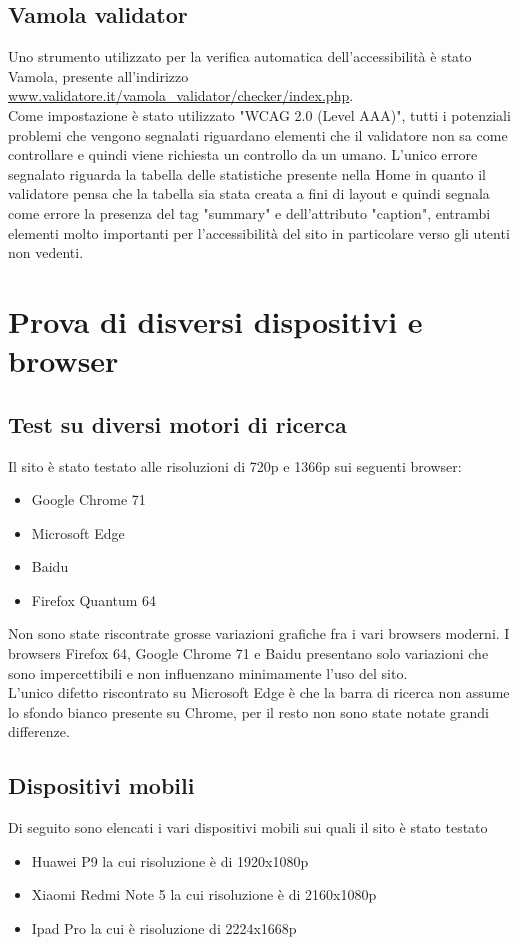 \documentclass[openany, a4paper, 12pt]{report}
\begin{document}
			\subsection{Vamola validator}
				Uno strumento utilizzato per la verifica automatica dell'accessibilità è stato Vamola, presente all'indirizzo \url{www.validatore.it/vamola_validator/checker/index.php}.\\
				Come impostazione è stato utilizzato "WCAG 2.0 (Level AAA)", tutti i potenziali problemi che vengono segnalati riguardano elementi che il validatore non sa come controllare e quindi viene richiesta un controllo da un umano.
				L'unico errore segnalato riguarda la tabella delle statistiche presente nella Home in quanto il validatore pensa che la tabella sia stata creata a fini di layout e quindi segnala come errore la presenza del tag "summary" e dell'attributo "caption", entrambi elementi molto importanti per l'accessibilità del sito in particolare verso gli utenti non vedenti.\\
	\section{Prova di disversi dispositivi e browser}
		\subsection{Test su diversi motori di ricerca}
			Il sito è stato testato alle risoluzioni di 720p e 1366p sui seguenti browser:
				\begin{itemize}
					\item Google Chrome 71
					\item Microsoft Edge
					\item Baidu
					\item Firefox Quantum 64
				\end{itemize}
				Non sono state riscontrate grosse variazioni grafiche fra i vari browsers moderni. I browsers Firefox 64, Google Chrome 71 e Baidu presentano solo variazioni che sono impercettibili e non influenzano minimamente l'uso del sito.\\
				L'unico difetto riscontrato su Microsoft Edge è che la barra di ricerca non assume lo sfondo bianco presente su Chrome, per il resto non sono state notate grandi differenze.
				
				\subsection{Dispositivi mobili}
				Di seguito sono elencati i vari dispositivi mobili sui quali il sito è stato testato
				\begin{itemize}
				\item Huawei P9 la cui risoluzione è di 1920x1080p
				\item Xiaomi Redmi Note 5 la cui risoluzione è di 2160x1080p
				\item Ipad Pro la cui è risoluzione di 2224x1668p
				\end{itemize}
			
\end{document}
